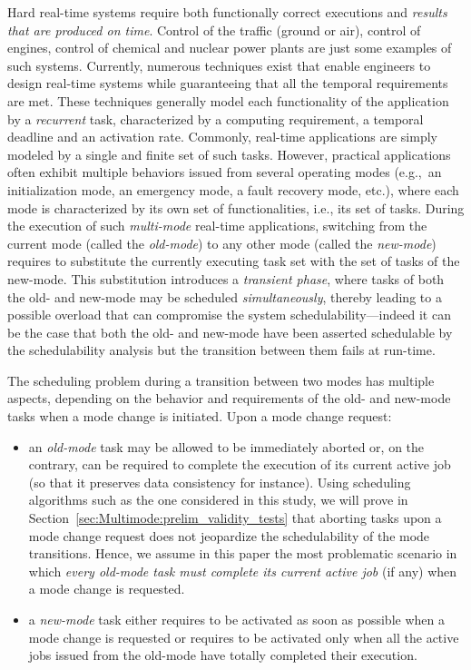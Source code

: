 \documentclass{article}
\newtheorem{validity test}{Validity Test}
\begin{document}
Hard real-time systems require both functionally correct executions and \emph{results that are produced on time}. Control of the traffic (ground or air), control of engines, control of chemical and nuclear power plants are just some examples of such systems. Currently, numerous techniques exist that enable engineers to design real-time systems while guaranteeing that all the temporal requirements are met. These techniques generally model each functionality of the application by a \emph{recurrent} task, characterized by a computing requirement, a temporal deadline and an activation rate. Commonly, real-time applications are simply modeled by a single and finite set of such tasks. However, practical applications often exhibit multiple behaviors issued from several operating modes (e.g.,~an initialization mode, an emergency mode, a fault recovery mode, etc.), where each mode is characterized by its own set of functionalities, i.e., its set of tasks. During the execution of such \emph{multi-mode} real-time applications, switching from the current mode (called the \emph{old-mode}) to any other mode (called the \emph{new-mode}) requires to substitute the currently executing task set with the set of tasks of the new-mode. This substitution introduces a {\em transient phase}, where tasks of both the old- and new-mode may be scheduled \emph{simultaneously}, thereby leading to a possible overload that can compromise the system schedulability---indeed it can be the case that both the old- and new-mode have been asserted schedulable by the schedulability analysis but the transition between them fails at run-time.

The scheduling problem during a transition between two modes has multiple aspects, depending on the behavior and requirements of the old- and new-mode tasks when a mode change is initiated. Upon a mode change request: 
\begin{itemize}
\item an \emph{old-mode} task may be allowed to be immediately aborted or, on the contrary, can be required to complete the execution of its current active job (so that it preserves data consistency for instance). Using scheduling algorithms such as the one considered in this study, we will prove in Section~\ref{sec:Multimode:prelim_validity_tests} that aborting tasks upon a mode change request does not jeopardize the schedulability of the mode transitions. Hence, we assume in this paper the most problematic scenario in which \emph{every old-mode task must complete its current active job} (if any) when a mode change is requested.
\item a \emph{new-mode} task either requires to be activated as soon as possible when a mode change is requested or requires to be activated only when all the active jobs issued from the old-mode have totally completed their execution. 
\end{itemize}
\end{document}
